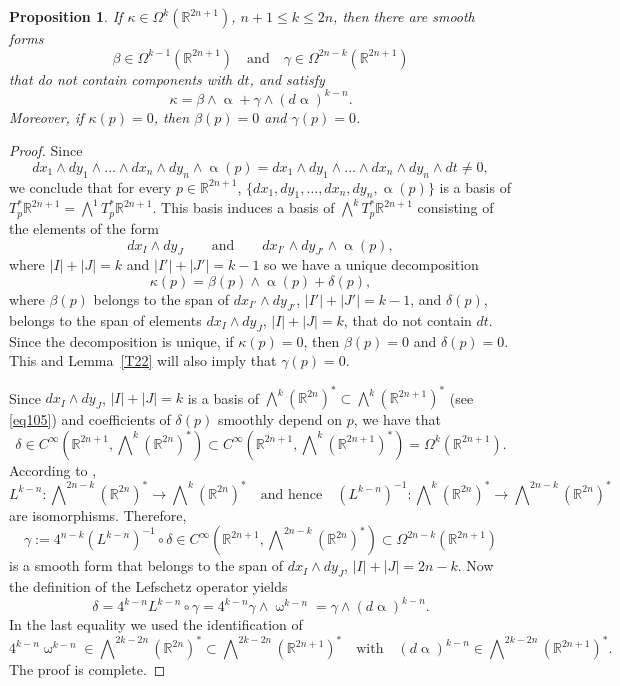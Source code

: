 \documentclass[intlimits,12pt,reqno]{amsart}
\newcommand{\R}{\mathbb R}
\numberwithin{equation}{section}
\newtheorem{proposition}[theorem]{Proposition}
\theoremstyle{definition}
\newcommand{\Ep}{\bigwedge\nolimits}
\begin{document}
\begin{proposition}
\label{T48}
If $\kappa\in \Omega^k(\R^{2n+1})$, $n+1\leq k\leq 2n$, then there are smooth forms
$$
\beta\in \Omega^{k-1}(\R^{2n+1})
\quad
\text{and}
\quad
\gamma\in \Omega^{2n-k}(\R^{2n+1})
$$
that do not contain components with $dt$, and satisfy
$$
\kappa=\beta\wedge\upalpha+\gamma\wedge(d\upalpha)^{k-n}.
$$
Moreover, if $\kappa(p)=0$, then $\beta(p)=0$ and $\gamma(p)=0$.
\end{proposition}
\begin{proof}
Since
$$
dx_1\wedge dy_1\wedge\ldots\wedge dx_n\wedge dy_n\wedge \upalpha(p)=
dx_1\wedge dy_1\wedge\ldots\wedge dx_n\wedge dy_n\wedge dt\neq 0,
$$
we conclude that for every $p\in\R^{2n+1}$,
$\{dx_1,dy_1,\ldots,dx_n,dy_n,\upalpha(p)\}$
is a basis of $T^*_p\R^{2n+1}=\Ep^1 T^*_p\R^{2n+1}$.
This basis induces a basis of $\Ep^k T_p^*\R^{2n+1}$ consisting of the elements of the form
$$
dx_I\wedge dy_J  
\qquad
\text{and}
\qquad
dx_{I'}\wedge dy_{J'}\wedge\upalpha(p),  
$$
where $|I|+|J|=k$ and $|I'|+|J'|=k-1$ so we have a unique decomposition
$$
\kappa(p)=\beta(p)\wedge \upalpha(p)+\delta(p),
$$
where 
$\beta(p)$ belongs to the span of $dx_{I'}\wedge dy_{J'}$, $|I'|+|J'|=k-1$, and
$\delta(p)$, belongs to the span of elements $dx_I\wedge dy_J$, $|I|+|J|=k$, that do not contain $dt$. 
Since the decomposition is unique, if $\kappa(p)=0$, then $\beta(p)=0$ and $\delta(p)=0$. This and Lemma~\ref{T22} will also imply that $\gamma(p)=0$.

Since $dx_I\wedge dy_J$, $|I|+|J|=k$ is a basis of 
$\Ep^k(\R^{2n})^*\subset\Ep^k(\R^{2n+1})^*$ (see \eqref{eq105}) and coefficients of $\delta(p)$ smoothly depend on $p$, we have that
$$
\delta\in C^\infty\left(\R^{2n+1},\Ep^k(\R^{2n})^*\right)\subset
C^\infty\left(\R^{2n+1},\Ep^k(\R^{2n+1})^*\right)=\Omega^k(\R^{2n+1}).
$$
According to ,
$$
L^{k-n}:\Ep^{2n-k}(\R^{2n})^*\to\Ep^k(\R^{2n})^*
\quad
\text{and hence}
\quad
(L^{k-n})^{-1}:\Ep^k(\R^{2n})^*\to\Ep^{2n-k}(\R^{2n})^*
$$
are isomorphisms. Therefore,
$$
\gamma:=4^{n-k}(L^{k-n})^{-1}\circ\delta\in
C^\infty\left(\R^{2n+1},\Ep^{2n-k}(\R^{2n})^*\right)\subset
\Omega^{2n-k}(\R^{2n+1})
$$
is a smooth form that belongs to the span of $dx_I\wedge dy_J$, $|I|+|J|=2n-k$.
Now the definition of the Lefschetz operator yields
$$
\delta=4^{k-n}L^{k-n}\circ\gamma=4^{k-n}\gamma\wedge\upomega^{k-n}=\gamma\wedge (d\upalpha)^{k-n}.
$$
In the last equality we used the identification of 
$$
4^{k-n}\upomega^{k-n}\in \Ep^{2k-2n}(\R^{2n})^*\subset \Ep^{2k-2n}(\R^{2n+1})^*
\quad
\text{with}
\quad
(d\upalpha)^{k-n}\in \Ep^{2k-2n}(\R^{2n+1})^*.
$$
The proof is complete.
\end{proof}
\end{document}
